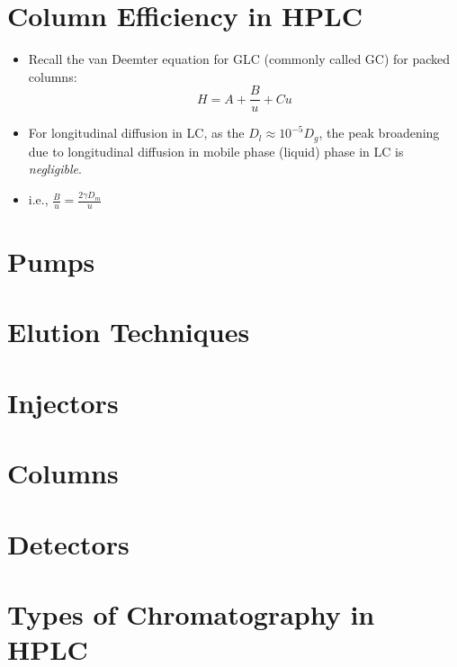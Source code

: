 \documentclass[a4paper, 12pt]{article}
\begin{document}
\section{Column Efficiency in HPLC}
\begin{itemize}
	\item Recall the van Deemter equation for GLC (commonly called GC) for packed columns:
	\begin{equation}
		H = A + \frac{B}{u} + Cu
	\end{equation}
	\item For longitudinal diffusion in LC, as the $D_l \approx 10^{-5}D_g$, the peak broadening due to longitudinal diffusion in mobile phase (liquid) phase in LC is \textit{negligible}.
	\item i.e., $\frac{B}{u} = \frac{2\gamma{}D_m}{u}$
\end{itemize}


\section{Pumps}


\section{Elution Techniques}


\section{Injectors}


\section{Columns}


\section{Detectors}


\section{Types of Chromatography in HPLC}
\end{document}
